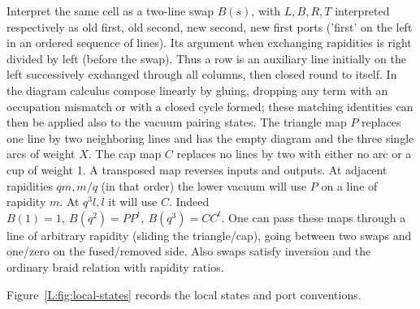 Interpret the same cell as a two-line swap \(B(s)\), with \(L,B,R,T\) interpreted respectively as old first, old second, new second, new first ports ('first' on the left in an ordered sequence of lines). Its argument when exchanging rapidities is right divided by left (before the swap). Thus a row is an auxiliary line initially on the left successively exchanged through all columns, then closed round to itself. In the diagram calculus compose linearly by gluing, dropping any term with an occupation mismatch or with a closed cycle formed; these matching identities can then be applied also to the vacuum pairing states. The triangle map \(P\) replaces one line by two neighboring lines and has the empty diagram and the three single arcs of weight \(X\). The cap map \(C\) replaces no lines by two with either no arc or a cup of weight 1. A transposed map reverses inputs and outputs. At adjacent rapidities \(q m,m/q\) (in that order) the lower vacuum will use \(P\) on a line of rapidity \(m\). At \(q^3 l,l\) it will use \(C\). Indeed \(B(1)=1,\ B(q^2)=P P^t,\ B(q^3)=CC^t\). One can pass these maps through a line of arbitrary rapidity (sliding the triangle/cap), going between two swaps and one/zero on the fused/removed side. Also swaps satisfy inversion and the ordinary braid relation with rapidity ratios.

Figure~\ref{L:fig:local-states} records the local states and port conventions.


